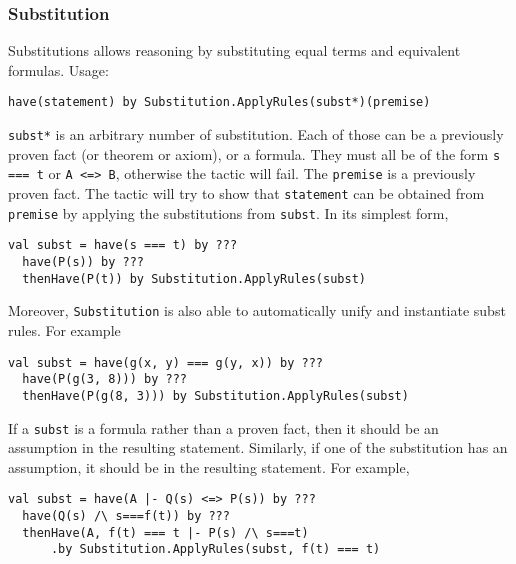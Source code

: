 \subsubsection*{Substitution}
Substitutions allows reasoning by substituting equal terms and equivalent formulas. Usage:
\begin{lstlisting}[language=lisa]
  have(statement) by Substitution.ApplyRules(subst*)(premise)
\end{lstlisting}

\lstinline|subst*| is an arbitrary number of substitution. Each of those can be a previously proven fact (or theorem or axiom), or a formula. They must all be of the form \lstinline|s === t| or \lstinline|A <=> B|, otherwise the tactic will fail. The \lstinline|premise| is a previously proven fact. The tactic will try to show that \lstinline|statement| can be obtained from \lstinline|premise| by applying the substitutions from \lstinline|subst|. In its simplest form,
\begin{lstlisting}[language=lisa]
  val subst = have(s === t) by ???
  have(P(s)) by ???
  thenHave(P(t)) by Substitution.ApplyRules(subst)
\end{lstlisting}

Moreover, \lstinline|Substitution| is also able to  automatically unify and instantiate subst rules. For example

\begin{lstlisting}[language=lisa]
  val subst = have(g(x, y) === g(y, x)) by ???
  have(P(g(3, 8))) by ???
  thenHave(P(g(8, 3))) by Substitution.ApplyRules(subst)
\end{lstlisting}

If a \lstinline|subst| is a formula rather than a proven fact, then it should be an assumption in the resulting statement. Similarly, if one of the substitution has an assumption, it should be in the resulting statement. For example,

\begin{lstlisting}[language=lisa]
  val subst = have(A |- Q(s) <=> P(s)) by ???
  have(Q(s) /\ s===f(t)) by ???
  thenHave(A, f(t) === t |- P(s) /\ s===t) 
      .by Substitution.ApplyRules(subst, f(t) === t)
\end{lstlisting}
